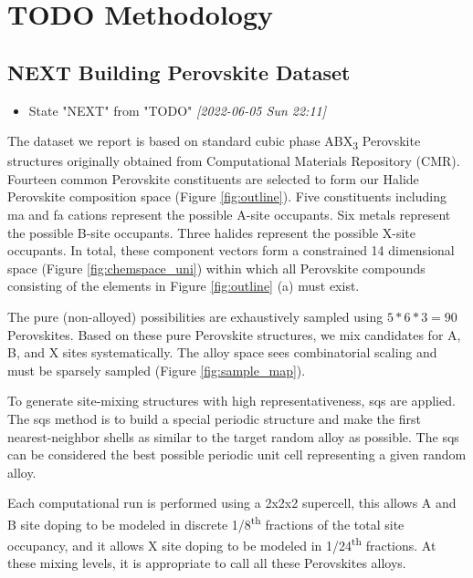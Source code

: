 \documentclass[twoside, twocolumn, 9pt, draft]{article}
\begin{document}
\section*{{\bfseries\sffamily TODO} Methodology}
\label{sec:org8caf7fd}
\subsection*{{\bfseries\sffamily NEXT} Building Perovskite Dataset}
\label{sec:org0a48644}
\begin{itemize}
\item State "NEXT"       from "TODO"       \textit{[2022-06-05 Sun 22:11]}
\end{itemize}
The dataset we report is based on standard cubic phase ABX\textsubscript{3}
Perovskite structures originally obtained from Computational Materials
Repository (CMR)\cite{pilania-2016-machin-learn}. Fourteen common
Perovskite constituents are selected to form our Halide Perovskite
composition space (Figure \ref{fig:outline}). Five constituents
including \acrshort{ma} and \acrshort{fa} cations represent the possible A-site
occupants. Six metals represent the possible B-site occupants. Three
halides represent the possible X-site occupants. In total, these
component vectors form a constrained 14 dimensional space (Figure
\ref{fig:chemspace_uni}) within which all Perovskite compounds
consisting of the elements in Figure \ref{fig:outline} (a) must exist.

The pure (non-alloyed) possibilities are exhaustively sampled using
\(5*6*3 = 90\) Perovskites. Based on these pure Perovskite structures,
we mix candidates for A, B, and X sites systematically. The alloy
space sees combinatorial scaling and must be sparsely sampled (Figure
\ref{fig:sample_map}).

To generate site-mixing structures with high representativeness,
\acrfull{sqs} are applied. The \acrshort{sqs} method is
to build a special periodic structure and make the first
nearest-neighbor shells as similar to the target random alloy as
possible. The \acrshort{sqs} can be considered the best possible periodic unit
cell representing a given random alloy.

Each computational run is performed using a 2x2x2 supercell, this
allows A and B site doping to be modeled in discrete 1/8\textsuperscript{th} fractions
of the total site occupancy, and it allows X site doping to be modeled
in 1/24\textsuperscript{th} fractions. At these mixing levels, it is appropriate to
call all these Perovskites alloys.
\end{document}
